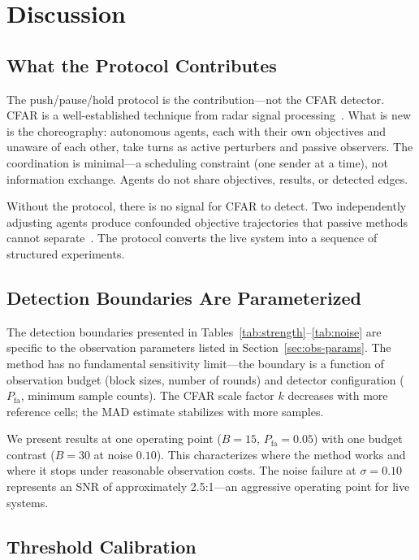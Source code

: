\section{Discussion}
\label{sec:discussion}

\subsection{What the Protocol Contributes}

The push/pause/hold protocol is the contribution---not the CFAR
detector. CFAR is a well-established technique from radar signal
processing~\citep{finn1968cfar}. What is new is the choreography:
autonomous agents, each with their own objectives and unaware of
each other, take turns as active perturbers and passive observers.
The coordination is minimal---a scheduling constraint (one sender at
a time), not information exchange. Agents do not share objectives,
results, or detected edges.

Without the protocol, there is no signal for CFAR to detect. Two
independently adjusting agents produce confounded objective
trajectories that passive methods cannot separate~\citep{sugihara2012ccm}.
The protocol converts the live system into a sequence of structured
experiments.

\subsection{Detection Boundaries Are Parameterized}

The detection boundaries presented in
Tables~\ref{tab:strength}--\ref{tab:noise} are specific to the
observation parameters listed in Section~\ref{sec:obs-params}. The
method has no fundamental sensitivity limit---the boundary is a
function of observation budget (block sizes, number of rounds) and
detector configuration ($P_{\text{fa}}$, minimum sample counts).
The CFAR scale factor $k$ decreases with more reference cells;
the MAD estimate stabilizes with more samples.

We present results at one operating point ($B = 15$, $P_{\text{fa}} =
0.05$) with one budget contrast ($B = 30$ at noise $0.10$). This
characterizes where the method works and where it stops under
reasonable observation costs. The noise failure at $\sigma = 0.10$
represents an SNR of approximately 2.5:1---an aggressive operating
point for live systems.

\subsection{Threshold Calibration}

